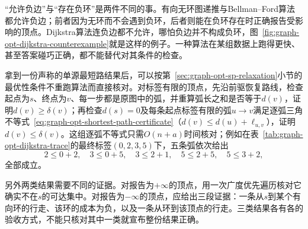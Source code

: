 “允许负边”与“存在负环”是两件不同的事。有向无环图递推与Bellman--Ford算法都允许负边；前者因为无环而不会遇到负环，后者则能在负环存在时正确报告受影响的顶点。Dijkstra算法连负边都不允许，哪怕负边并不构成负环，图~\ref{fig:graph-opt-dijkstra-counterexample}就是这样的例子。一种算法在某组数据上跑得更快、甚至答案碰巧正确，都不能替代对其条件的检查。

拿到一份声称的单源最短路结果后，可以按第~\ref{sec:graph-opt-sp-relaxation}小节的最优性条件不重跑算法而直接核对。对标签有限的顶点，先沿前驱恢复路线，检查起点为$s$、终点为$v$、每一步都是原图中的弧，并重算弧长之和是否等于$d(v)$，证明$d(v)\geq\delta(v)$；再检查$d(s)=0$及每条起点标签有限的弧$u\to v$满足逐弧三角不等式~\eqref{eq:graph-opt-shortest-path-certificate}（$d(v)\leq d(u)+\ell_{u,v}$），证明$d(v)\leq\delta(v)$。这组逐弧不等式只需$O(n+a)$时间核对；例如在表~\ref{tab:graph-opt-dijkstra-trace}的最终标签$(0,2,3,5)$下，五条弧依次给出
\[
  2\leq0+2,\quad 3\leq0+5,\quad 3\leq2+1,\quad 5\leq2+5,\quad 5\leq3+2,
\]
全部成立。

另外两类结果需要不同的证据。对报告为$+\infty$的顶点，用一次广度优先遍历核对它确实不在$s$的可达集中。对报告为$-\infty$的顶点，应给出三段证据：一条从$s$到某个有向环的行走、该环的成本为负，以及一条从环到该顶点的行走。三类结果各有各的验收方式，不能只核对其中一类就宣布整份结果正确。
